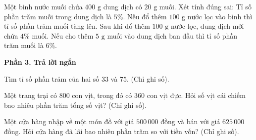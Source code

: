 \begin{ex} %
Một bình nước muối chứa $400\text{ g}$ dung dịch có $20\text{ g}$ muối. Xét tính đúng sai:
\choiceTF
{\True Tỉ số phần trăm muối trong dung dịch là $5\%$.}
{Nếu đổ thêm $100\text{ g}$ nước lọc vào bình thì tỉ số phần trăm muối tăng lên.}
{\True Sau khi đổ thêm $100\text{ g}$ nước lọc, dung dịch mới chứa $4\%$ muối.}
{Nếu cho thêm $5\text{ g}$ muối vào dung dịch ban đầu thì tỉ số phần trăm muối là $6\%$.}
\end{ex}

\textbf{Phần 3. Trả lời ngắn}

\begin{ex} %
Tìm tỉ số phần trăm của hai số $33$ và $75$. (Chỉ ghi số).
\end{ex}

\begin{ex} %
Một trang trại có $800$ con vịt, trong đó có $360$ con vịt đực. Hỏi số vịt cái chiếm bao nhiêu phần trăm tổng số vịt? (Chỉ ghi số).
\end{ex}

\begin{ex} %
Một cửa hàng nhập về một món đồ với giá $500\,000$ đồng và bán với giá $625\,000$ đồng. Hỏi cửa hàng đã lãi bao nhiêu phần trăm so với tiền vốn? (Chỉ ghi số).
\end{ex}


